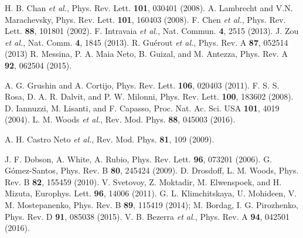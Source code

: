 \documentclass[aps,pra,superscriptaddress,amsmath,amssymb,showpacs,twocolumn,notitlepage]{revtex4-1}
\begin{document}
\begin{thebibliography}{100}
 H. B. Chan \emph{et al.}, Phys. Rev. Lett. {\bf 101}, 030401 (2008).
 A. Lambrecht and V.N. Marachevsky, Phys. Rev. Lett. {\bf 101}, 160403 (2008).
 F. Chen \emph{et al.}, Phys. Rev. Lett. {\bf 88}, 101801 (2002).
  F. Intravaia \emph{et al.}, Nat. Commun. {\bf 4}, 2515 (2013).
 J. Zou \emph{et al.}, Nat. Comm. {\bf 4}, 1845 (2013).
 R. Gu\'erout \emph{et al.}, Phys. Rev. A {\bf 87}, 052514 (2013)
 R. Messina, P. A. Maia Neto, B. Guizal, and M. Antezza, Phys. Rev. A {\bf 92}, 062504 (2015).


 A. G. Grushin and A. Cortijo, Phys. Rev. Lett. {\bf 106}, 020403 (2011).
 F. S. S. Rosa, D. A. R. Dalvit, and P. W. Milonni, Phys. Rev. Lett. {\bf 100}, 183602 (2008).
 D. Iannuzzi, M. Lisanti, and F. Capasso, Proc. Nat. Ac. Sci. USA {\bf 101}, 4019 (2004).
 L. M. Woods \emph{et al.}, Rev. Mod. Phys. {\bf 88}, 045003 (2016).


 A. H. Castro Neto \emph{et al.}, Rev. Mod. Phys. {\bf 81}, 109 (2009).

 J. F. Dobson, A. White, A. Rubio, Phys. Rev. Lett. {\bf 96}, 073201 (2006). 
 G. G\'omez-Santos, Phys. Rev. B {\bf 80}, 245424 (2009).
 D. Drosdoff, L. M. Woods, Phys. Rev. B {\bf 82}, 155459 (2010).
 V. Svetovoy, Z. Moktadir, M. Elwenspoek, and H. Mizuta, Europhys. Lett. {\bf 96}, 14006 (2011).
 G. L. Klimchitskaya, U. Mohideen, V. M. Mostepanenko, Phys. Rev. B {\bf 89}, 115419 (2014);
 M. Bordag, I. G. Pirozhenko, Phys. Rev. D {\bf 91}, 085038 (2015). 
 V. B. Bezerra \emph{et al.}, Phys. Rev. A {\bf 94}, 042501 (2016).


\end{thebibliography}
\end{document}
